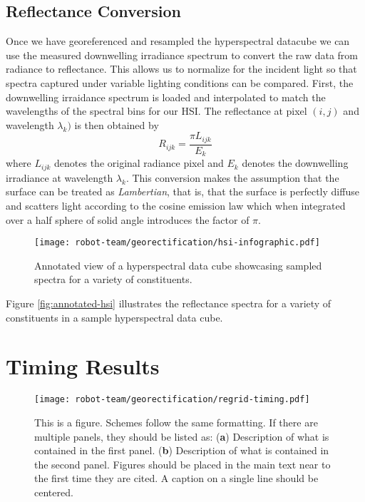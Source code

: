\subsection{Reflectance Conversion}

Once we have georeferenced and resampled the hyperspectral datacube we can use the measured downwelling irradiance spectrum to convert the raw data from radiance to reflectance. This allows us to normalize for the incident light so that spectra captured under variable lighting conditions can be compared. First, the downwelling irraidance spectrum is loaded and interpolated to match the wavelengths of the spectral bins for our HSI. The reflectance at pixel $(i,j)$ and wavelength $\lambda_k)$ is then obtained by
\begin{equation}
  R_{ijk} = \frac{\pi L_{ijk}}{E_k}
\end{equation}
where $L_{ijk}$ denotes the original radiance pixel and $E_k$ denotes the downwelling irradiance at wavelength $\lambda_k$. This conversion makes the assumption that the surface can be treated as \textit{Lambertian}, that is, that the surface is perfectly diffuse and scatters light according to the cosine emission law which when integrated over a half sphere of solid angle introduces the factor of $\pi$.

\begin{figure}[h]
  \centering
  \texttt{[image: robot-team/georectification/hsi-infographic.pdf]}
  \caption{Annotated view of a hyperspectral data cube showcasing sampled spectra for a variety of constituents.\label{fig:hsi-infographic}}
  \label{fig:annoted-hsi}
\end{figure}  

Figure \ref{fig:annotated-hsi} illustrates the reflectance spectra for a variety of constituents in a sample hyperspectral data cube.


\section{Timing Results}


\begin{figure}[h]
    \texttt{[image: robot-team/georectification/regrid-timing.pdf]}
    \caption{This is a figure. Schemes follow the same formatting. If there are multiple panels, they should be listed as: (\textbf{a}) Description of what is contained in the first panel. (\textbf{b}) Description of what is contained in the second panel. Figures should be placed in the main text near to the first time they are cited. A caption on a single line should be centered.}
    \label{fig-regridding-timing}
\end{figure}

